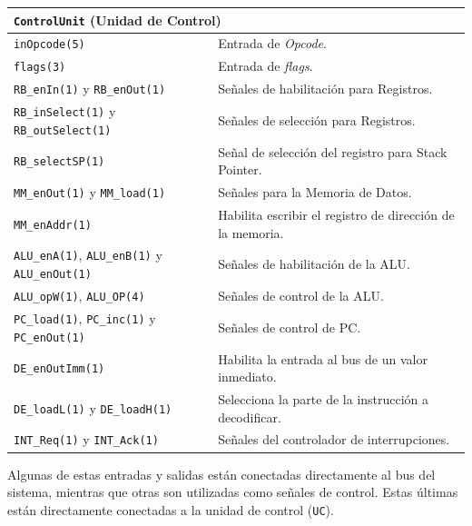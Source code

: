 \documentclass[a4paper,11pt]{article}
\begin{document}
\begin{center}
\begin{tabular}{p{6.4cm}|p{8.2cm}}
\multicolumn{2}{l}{ \texttt{ControlUnit} (Unidad de Control) }\\ %
\hline
\texttt{inOpcode(5)}                                                 & Entrada de \emph{Opcode}.\\
\texttt{flags(3)}                                                    & Entrada de \emph{flags}.\\
\texttt{RB\_enIn(1)} y \texttt{RB\_enOut(1)}                         & Señales de habilitación para Registros.\\
\texttt{RB\_inSelect(1)} y \texttt{RB\_outSelect(1)}                 & Señales de selección para Registros.\\
\texttt{RB\_selectSP(1)}                                             & Señal de selección del registro para Stack Pointer.\\
\texttt{MM\_enOut(1)} y \texttt{MM\_load(1)}                         & Señales para la Memoria de Datos.\\
\texttt{MM\_enAddr(1)}                                               & Habilita escribir el registro de dirección de la memoria.\\
\texttt{ALU\_enA(1)}, \texttt{ALU\_enB(1)} y \texttt{ALU\_enOut(1)}  & Señales de habilitación de la ALU.\\
\texttt{ALU\_opW(1)}, \texttt{ALU\_OP(4)}                            & Señales de control de la ALU.\\
\texttt{PC\_load(1)}, \texttt{PC\_inc(1)} y \texttt{PC\_enOut(1)}    & Señales de control de PC.\\
\texttt{DE\_enOutImm(1)}                                             & Habilita la entrada al bus de un valor inmediato.\\
\texttt{DE\_loadL(1)} y \texttt{DE\_loadH(1)}                        & Selecciona la parte de la instrucción a decodificar.\\
\texttt{INT\_Req(1)} y \texttt{INT\_Ack(1)}                          & Señales del controlador de interrupciones.\\
\end{tabular}
\end{center}

\normalsize

Algunas de estas entradas y salidas están conectadas directamente al bus del sistema, mientras que otras son utilizadas como señales de control.
Estas últimas están directamente conectadas a la unidad de control (\texttt{UC}).
\end{document}
